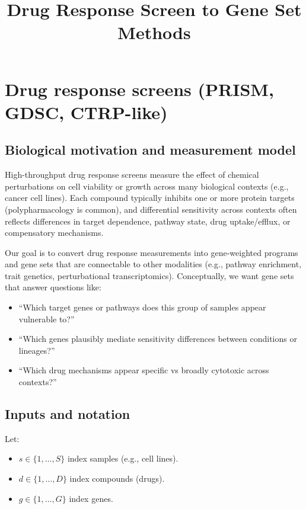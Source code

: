 \documentclass[11pt]{article}
\title{Drug Response Screen to Gene Set Methods}
\author{}
\date{}
\begin{document}
\maketitle

\section{Drug response screens (PRISM, GDSC, CTRP-like)}
\label{sec:drug_response}

\subsection{Biological motivation and measurement model}
High-throughput drug response screens measure the effect of chemical perturbations on cell viability or growth across many biological contexts (e.g., cancer cell lines). Each compound typically inhibits one or more protein targets (polypharmacology is common), and differential sensitivity across contexts often reflects differences in target dependence, pathway state, drug uptake/efflux, or compensatory mechanisms.

Our goal is to convert drug response measurements into gene-weighted programs and gene sets that are connectable to other modalities (e.g., pathway enrichment, trait genetics, perturbational transcriptomics). Conceptually, we want gene sets that answer questions like:
\begin{itemize}
  \item ``Which target genes or pathways does this group of samples appear vulnerable to?''
  \item ``Which genes plausibly mediate sensitivity differences between conditions or lineages?''
  \item ``Which drug mechanisms appear specific vs broadly cytotoxic across contexts?''
\end{itemize}

\subsection{Inputs and notation}
Let:
\begin{itemize}
  \item $s \in \{1,\dots,S\}$ index samples (e.g., cell lines).
  \item $d \in \{1,\dots,D\}$ index compounds (drugs).
  \item $g \in \{1,\dots,G\}$ index genes.
\end{itemize}
\end{document}
